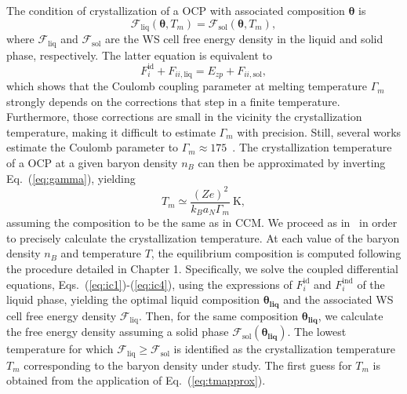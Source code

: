 The condition of crystallization of a OCP with associated composition 
$\bm{\theta}$ is 
%
\begin{equation}
  \mathcal{F}_{\text{liq}}(\bm{\theta}, T_m) 
  = \mathcal{F}_{\text{sol}}(\bm{\theta}, T_m),
\end{equation}
%
where $\mathcal{F}_\text{liq}$ and $\mathcal{F}_\text{sol}$ are the WS cell
free energy density in the liquid and solid phase, respectively.
The latter equation is equivalent to
%
\begin{equation}
  F_i^{\text{id}} + F_{ii,\text{liq}} = E_{zp} + F_{ii,\text{sol}},
\end{equation}
%
which shows that the Coulomb coupling parameter at melting
temperature $\Gamma_m$ strongly depends on the corrections that step in a
finite temperature. Furthermore, those corrections are small in the vicinity
the crystallization temperature, making it difficult to estimate $\Gamma_m$
with precision. Still, several works estimate the Coulomb parameter to 
$\Gamma_m \approx 175$~\cite{VanHorn1969,Haensel2007}. 
The crystallization temperature of a OCP at a given baryon density $n_B$ 
can then be approximated by inverting Eq.~(\ref{eq:gamma}), yielding
%
\begin{equation}
  T_m \simeq \frac{(Ze)^2}{k_B a_N \Gamma_m} \ \text{K},\label{eq:tmapprox}
\end{equation}
%
assuming the composition to be the same as in CCM. 
%
We proceed as in~\cite{Fantina2020} in order to precisely calculate the 
crystallization temperature. At each value of the baryon density $n_B$ and 
temperature $T$, the equilibrium composition is computed following the 
procedure detailed in Chapter 1. Specifically, we solve the coupled 
differential equations, Eqs.~(\ref{eq:ic1})-(\ref{eq:ic4}), using the 
expressions of $F_{i}^{\text{id}}$ and $F_{i}^{\text{ind}}$ of the liquid 
phase, yielding the optimal liquid composition $\bm{\theta_{\text{liq}}}$ and 
the associated WS cell free energy density $\mathcal{F}_{\text{liq}}$. Then, 
for the same composition $\bm{\theta_{\text{liq}}}$, we calculate the free 
energy density assuming a solid phase 
$\mathcal{F}_{\text{sol}}(\bm{\theta_{\text{liq}}})$. The lowest temperature 
for which $\mathcal{F}_{\text{liq}} \geq \mathcal{F}_{\text{sol}}$ is 
identified as the crystallization temperature $T_m$ corresponding to the 
baryon density under study. The first guess for $T_m$ is obtained from the
application of Eq.~(\ref{eq:tmapprox}).

